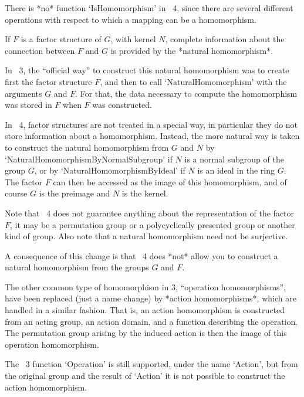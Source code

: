 There is *no* function `IsHomomorphism' in {\GAP}~4,
since there are several different operations with respect to which a
mapping can be a homomorphism.



If $F$ is a factor structure of $G$, with kernel $N$, complete
information about the connection between $F$ and $G$ is provided by
the *natural homomorphism*.

In {\GAP}~3, the ``official way'' to construct this natural homomorphism
was to create first the factor structure $F$, and then to call
`NaturalHomomorphism' with the arguments $G$ and $F$.
For that, the data necessary to compute the homomorphism was stored in
$F$ when $F$ was constructed.

In {\GAP}~4, factor structures are not treated in a special way,
in particular they do not store information about a homomorphism.
Instead, the more natural way is taken to construct the natural
homomorphism from $G$ and $N$ by `NaturalHomomorphismByNormalSubgroup'
if $N$ is a normal subgroup of the group $G$,
or by `NaturalHomomorphismByIdeal' if $N$ is an ideal in the ring $G$.
The factor $F$ can then be accessed as the image of this homomorphism,
and of course $G$ is the preimage and $N$ is the kernel.

Note that {\GAP}~4 does not guarantee anything about the representation
of the factor $F$, it may be a permutation group or a polycyclically
presented group or another kind of group.
Also note that a natural homomorphism need not be surjective.

A consequence of this change is that {\GAP}~4 does *not* allow you to
construct a natural homomorphism from the groups $G$ and $F$.

The other common type of homomorphism in {\GAP} 3, ``operation
homomorphisms'', have been replaced (just a name change) by *action
homomorphisms*, which are handled in a similar fashion.  That is, an
action homomorphism is constructed from an acting group, an action
domain, and a function describing the operation.  The permutation
group arising by the induced action is then the image of this
operation homomorphism.

The {\GAP}~3 function `Operation' is still supported, under the name `Action',
but from the original group and the result of `Action' it is not
possible to construct the action homomorphism.




